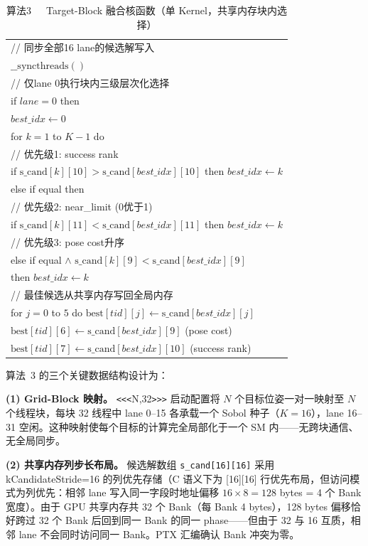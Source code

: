 \documentclass[twocolumn,a4paper,10pt]{ctexart}
\makeatletter
\newenvironment{algotable}[2]{%
  \begin{table}[htbp]
  \centering
  \caption{#2}
  \label{#1}
  \footnotesize\ttfamily
  \begin{tabular}{@{}p{\columnwidth}@{}}
  \toprule
}{%
  \\\bottomrule
  \end{tabular}
  \end{table}
}
\makeatother
\begin{document}
\begin{algotable}{alg:kernel}{算法3~~~Target-Block 融合核函数（单 Kernel，共享内存块内选择）}
// 同步全部16 lane的候选解写入\\
\quad $\_\_\mathrm{syncthreads}()$\\
// 仅lane 0执行块内三级层次化选择\\
\quad if $\textit{lane}=0$ then\\
\qquad $\textit{best\_idx}\leftarrow0$\\
\qquad for $k=1$ to $K-1$ do\\
// 优先级1: success rank\\
\qquad\quad if $\mathrm{s\_cand}[k][10]>\mathrm{s\_cand}[\textit{best\_idx}][10]$ then $\textit{best\_idx}\leftarrow k$\\
\qquad\quad else if equal then\\
// 优先级2: near\_limit (0优于1)\\
\qquad\qquad if $\mathrm{s\_cand}[k][11]<\mathrm{s\_cand}[\textit{best\_idx}][11]$ then $\textit{best\_idx}\leftarrow k$\\
// 优先级3: pose cost升序\\
\qquad\qquad else if equal $\land$ $\mathrm{s\_cand}[k][9]<\mathrm{s\_cand}[\textit{best\_idx}][9]$\\
\qquad\qquad\quad then $\textit{best\_idx}\leftarrow k$\\
// 最佳候选从共享内存写回全局内存\\
\qquad for $j=0$ to $5$ do $\mathrm{best}[\textit{tid}][j]\leftarrow\mathrm{s\_cand}[\textit{best\_idx}][j]$\\
\qquad $\mathrm{best}[\textit{tid}][6]\leftarrow\mathrm{s\_cand}[\textit{best\_idx}][9]$ (pose cost)\\
\qquad $\mathrm{best}[\textit{tid}][7]\leftarrow\mathrm{s\_cand}[\textit{best\_idx}][10]$ (success rank)
\end{algotable}

算法~3 的三个关键数据结构设计为：

\textbf{(1) Grid-Block 映射。} \texttt{<<<}N,32\texttt{>>>} 启动配置将 $N$ 个目标位姿一对一映射至 $N$ 个线程块，每块 32 线程中 lane 0--15 各承载一个 Sobol 种子（$K=16$），lane 16--31 空闲。这种映射使每个目标的计算完全局部化于一个 SM 内——无跨块通信、无全局同步。

\textbf{(2) 共享内存列步长布局。} 候选解数组 \texttt{s\_cand[16][16]} 采用 kCandidateStride=16 的列优先存储（C 语义下为 [16][16] 行优先布局，但访问模式为列优先：相邻 lane 写入同一字段时地址偏移 $16\times8=128$ bytes = 4 个 Bank 宽度）。由于 GPU 共享内存共 32 个 Bank（每 Bank 4 bytes），128 bytes 偏移恰好跨过 32 个 Bank 后回到同一 Bank 的同一 phase——但由于 32 与 16 互质，相邻 lane 不会同时访问同一 Bank。PTX 汇编确认 Bank 冲突为零。
\end{document}

